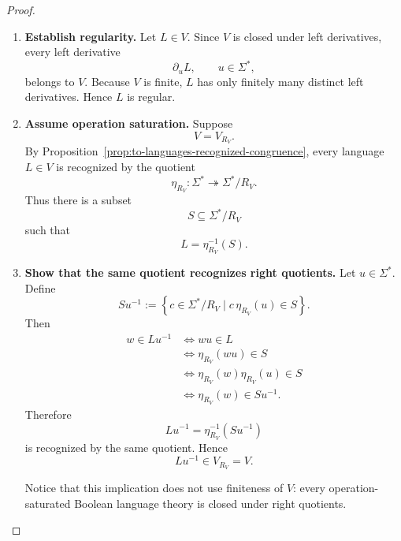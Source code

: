 \begin{proof}
    \leavevmode
    \begin{enumerate}
        \item \textbf{Establish regularity.}
        Let \(L\in V\). Since \(V\) is closed under left derivatives, every
        left derivative
        \[
            \partial_uL,
            \qquad
            u\in\Sigma^*,
        \]
        belongs to \(V\). Because \(V\) is finite, \(L\) has only finitely
        many distinct left derivatives. Hence \(L\) is regular.

        \item \textbf{Assume operation saturation.}
        Suppose
        \[
            V=V_{R_V}.
        \]
        By
        Proposition~\ref{prop:to-languages-recognized-congruence},
        every language \(L\in V\) is recognized by the quotient
        \[
            \eta_{R_V}:
            \Sigma^*\twoheadrightarrow
            \Sigma^*/R_V.
        \]
        Thus there is a subset
        \[
            S\subseteq\Sigma^*/R_V
        \]
        such that
        \[
            L=\eta_{R_V}^{-1}(S).
        \]

        \item \textbf{Show that the same quotient recognizes right quotients.}
        Let \(u\in\Sigma^*\). Define
        \[
            Su^{-1}
            :=
            \left\{
                c\in\Sigma^*/R_V
                \mid
                c\,\eta_{R_V}(u)\in S
            \right\}.
        \]
        Then
        \[
        \begin{aligned}
            w\in Lu^{-1}
            &\Longleftrightarrow
            wu\in L
            \\
            &\Longleftrightarrow
            \eta_{R_V}(wu)\in S
            \\
            &\Longleftrightarrow
            \eta_{R_V}(w)\eta_{R_V}(u)\in S
            \\
            &\Longleftrightarrow
            \eta_{R_V}(w)\in Su^{-1}.
        \end{aligned}
        \]
        Therefore
        \[
            Lu^{-1}
            =
            \eta_{R_V}^{-1}(Su^{-1})
        \]
        is recognized by the same quotient. Hence
        \[
            Lu^{-1}\in V_{R_V}=V.
        \]

        Notice that this implication does not use finiteness of \(V\):
        every operation-saturated Boolean language theory is closed under
        right quotients.


\end{enumerate}
\end{proof}
